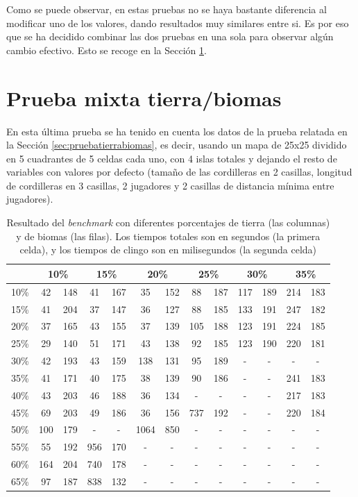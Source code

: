 Como se puede observar, en estas pruebas no se haya bastante diferencia al modificar uno de los valores, dando resultados muy similares entre si. Es por eso que se ha decidido combinar las dos pruebas en una sola para observar algún cambio efectivo. Esto se recoge en la Sección \ref{sec:pruebafinal}.

\section{Prueba mixta tierra/biomas}
\label{sec:pruebafinal}

En esta última prueba se ha tenido en cuenta los datos de la prueba relatada en la Sección \ref{sec:pruebatierrabiomas}, es decir, usando un mapa de 25x25 dividido en 5 cuadrantes de 5 celdas cada uno, con 4 islas totales y dejando el resto de variables con valores por defecto (tamaño de las cordilleras en 2 casillas, longitud de cordilleras en 3 casillas, 2 jugadores y 2 casillas de distancia mínima entre jugadores).

\begin{table}[!h]
	\centering
	\begin{tabularx}{\textwidth}{c|cccccccccccc}
	 & \multicolumn{2}{c}{10\%} & \multicolumn{2}{c}{15\%} & \multicolumn{2}{c}{20\%} & \multicolumn{2}{c}{25\%} & \multicolumn{2}{c}{30\%} & \multicolumn{2}{c}{35\%} \\
	\hline
	10\% & 42 & 148 & 41 & 167 & 35 & 152 & 88 & 187 & 117 & 189 & 214 & 183 \\
	15\% & 41 & 204 & 37 & 147 & 36 & 127 & 88 & 185 & 133 & 191 & 247 & 182 \\
	20\% & 37 & 165 & 43 & 155 & 37 & 139 & 105 & 188 & 123 & 191 & 224 & 185 \\
	25\% & 29 & 140 & 51 & 171 & 43 & 138 & 92 & 185 & 123 & 190 & 220 & 181 \\
	30\% & 42 & 193 & 43 & 159 & 138 & 131 & 95 & 189 & - & - & - & - \\
	35\% & 41 & 171 & 40 & 175 & 38 & 139 & 90 & 186 & - & - & 241 & 183 \\
	40\% & 43 & 203 & 46 & 188 & 36 & 134 & - & - & - & - & 217 & 183 \\
	45\% & 69 & 203 & 49 & 186 & 36 & 156 & 737 & 192 & - & - & 220 & 184 \\
	50\% & 100 & 179 & - & - & 1064 & 850 & - & - & - & - & - & - \\
	55\% & 55 & 192 & 956 & 170 & - & - & - & - & - & - & - & - \\
	60\% & 164 & 204 & 740 & 178 & - & - & - & - & - & - & - & - \\
	65\% & 97 & 187 & 838 & 132 & - & - & - & - & - & - & - & - \\
	\hline
	\end{tabularx}
	\caption{Resultado del \textit{benchmark} con diferentes porcentajes de tierra (las columnas) y de biomas (las filas). Los tiempos totales son en segundos (la primera celda), y los tiempos de clingo son en milisegundos (la segunda celda)}\label{table:finalresult}
\end{table}

